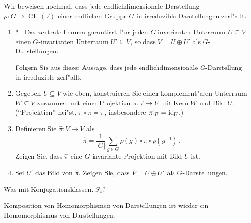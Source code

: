 \documentclass[a4,11pt]{article}
\newcommand{\bonusitem}{\item\hspace*{-2.4mm}*\ }
\begin{document}
\vspace*{-17mm}
{
\kopf
}



\begin{aufgabe}[4 Punkte]
  Wir beweisen nochmal, dass jede endlichdimensionale Darstellung
  $\rho \colon G \to \operatorname{GL}(V)$ einer endlichen Gruppe $G$ in irreduzible
  Darstellungen zerf"allt.
\begin{enumerate}
\addtocounter{enumi}{-1}
\bonusitem
Das zentrale Lemma garantiert f"ur jeden $G$-invarianten Unterraum $U
\subseteq V$ einen $G$-invarianten Unterraum $U' \subseteq V$, so dass
$V = U \oplus U'$ als $G$-Darstellungen.

Folgern Sie aus dieser Aussage, dass jede endlichdimensionale
$G$-Darstellung in irreduzible zerf"allt.
\item Gegeben $U \subseteq V$ wie oben, konstruieren Sie einen
  komplement"aren Unterraum $W \subseteq V$ zusammen mit einer
  Projektion $\pi \colon V \to U$ mit Kern $W$ und Bild
  $U$. ("`Projektion"' hei"st, $\pi \circ \pi = \pi$, insbesondere
  $\pi|_U = {\rm id}_U$.)
\item Definieren Sie $\hat \pi \colon V \to V$ als
  $$
  \hat \pi = \frac{1}{|G|} \sum_{g \in G} \rho(g) \circ \pi \circ \rho(g^{-1}) \,.
  $$
  Zeigen Sie, dass $\hat \pi$ eine $G$-invariante Projektion mit Bild $U$ ist.
\item Sei $U'$ das Bild von $\hat \pi$. Zeigen Sie, dass $V = U \oplus
  U'$ als $G$-Darstellungen.
  \end{enumerate}
\end{aufgabe}

\begin{aufgabe}[4 Punkte]
Was mit Konjugationsklassen. $S_4$?
\end{aufgabe}

\begin{aufgabe}[4 Punkte]
Komposition von Homomorphismen von Darstellungen ist wieder ein
Homomorphismus von Darstellungen.
\end{aufgabe}
\end{document}

